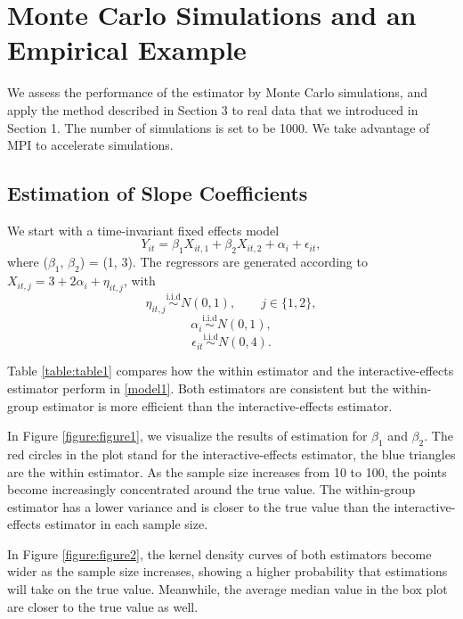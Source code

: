\documentclass[a4paper]{article}
\begin{document}
\newpage

\section{Monte Carlo Simulations and an Empirical Example}

We assess the performance of the estimator by Monte Carlo simulations, and apply the method described in Section 3 to real data that we introduced in Section 1. The number of simulations is set to be 1000. We take advantage of MPI to accelerate simulations.

\subsection{Estimation of Slope Coefficients}

We start with a time-invariant fixed effects model
\begin{equation}\label{model1}
    Y_{it} = \beta_{1}X_{it,1}+\beta_{2}X_{it,2}+\alpha_{i}+\epsilon_{it},
\end{equation}
where ($\beta_1$, $\beta_2$) = (1, 3). The regressors are generated according to
$X_{it,j}=3+2\alpha_i+\eta_{it,j}$, with $$\eta_{it,j}\stackrel{\text{i.i.d}}{\sim} N(0,1), \qquad j\in \{1,2\},$$ $$\alpha_i\stackrel{\text{i.i.d}}{\sim} N(0,1),$$ $$\epsilon_{it}\stackrel{\text{i.i.d}}{\sim} N(0,4).$$

Table \ref{table:table1} compares how the within estimator and the interactive-effects estimator perform in \eqref{model1}. Both estimators are consistent but the within-group estimator is more efficient than the interactive-effects estimator.

In Figure \ref{figure:figure1}, we visualize the results of estimation for $\beta_1$ and $\beta_2$. The red circles in the plot stand for the interactive-effects estimator, the blue triangles are the within estimator. As the sample size increases from 10 to 100, the points become increasingly concentrated around the true value. The within-group estimator has a lower variance and is closer to the true value than the interactive-effects estimator in each sample size.

In Figure \ref{figure:figure2}, the kernel density curves of both estimators become wider as the sample size increases, showing a higher probability that estimations will take on the true value. Meanwhile, the average median value in the box plot are closer to the true value as well.
\end{document}
